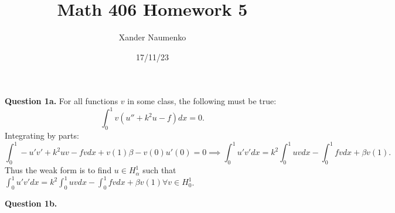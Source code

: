 \documentclass[letterpaper, reqno,11pt]{article}
\begin{document}
\title{Math 406 Homework 5}
\date{17/11/23}
\author{Xander Naumenko}
\maketitle

{\medskip\noindent\bf Question 1a.} For all functions $v$ in some class, the following must be true:
\[
\int_{0}^{1}v(u''+k^2u-f)dx=0
.\]
Integrating by parts:
\[
\int_0^{1}-u'v'+k^2uv-fvdx+v(1)\beta-v(0)u'(0)=0\implies \int_0^{1}u'v'dx=k^2\int_0^{1}uvdx-\int_0^{1}fvdx+\beta v(1)
.\]
Thus the weak form is to find $u\in H_\alpha^{1}$ such that $\int_0^{1}u'v'dx=k^2\int_0^{1}uvdx-\int_0^{1}fvdx+\beta v(1)\forall v\in H_0^{1}$.

{\medskip\noindent\bf Question 1b.} 
\end{document}
